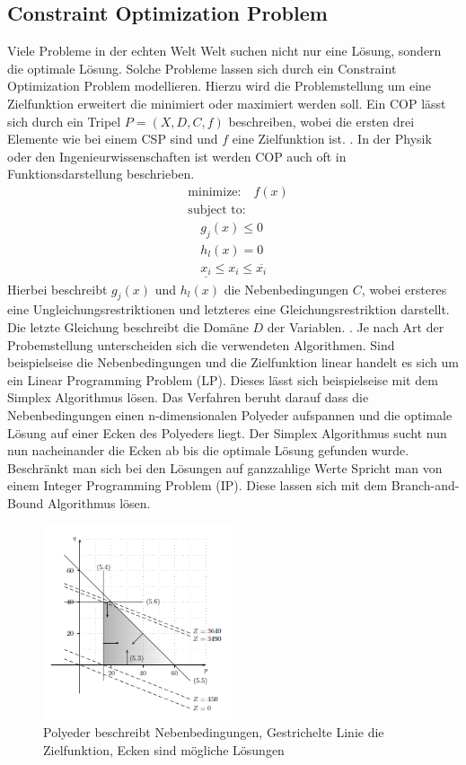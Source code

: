 \subsection{Constraint Optimization Problem}
\label{sec: Constraint Optimization Problem}
Viele Probleme in der echten Welt Welt suchen nicht nur eine Lösung, sondern die
optimale Lösung. Solche Probleme lassen sich durch ein Constraint Optimization
Problem modellieren. Hierzu wird die Problemstellung um eine Zielfunktion
erweitert die minimiert oder maximiert werden soll. Ein COP lässt sich durch ein
Tripel $P=(X,D,C,f)$ beschreiben, wobei die ersten drei Elemente wie bei einem
CSP sind und $f$ eine Zielfunktion ist. \cite[22]{amadi15jo}. In der Physik oder
den Ingenieurwissenschaften ist werden COP auch oft in Funktionsdarstellung
beschrieben.
\begin{align*}
    &\text{minimize:} \quad f(x) \\
    &\text{subject to:} \\
    &\quad g_j(x) \leq 0 \\
    &\quad h_l(x) = 0 \\
    &\quad \underline{x_i} \leq x_i \leq \overline{x_i}
\end{align*}
Hierbei beschreibt $g_j(x)$ und $h_l(x)$ die Nebenbedingungen $C$, wobei
ersteres eine Ungleichungsrestriktionen und letzteres eine Gleichungsrestriktion
darstellt. Die letzte Gleichung beschreibt die Domäne $D$ der Variablen.
\cite[154]{marti21bo}. Je nach Art der Probemstellung unterscheiden sich die
verwendeten Algorithmen. Sind beispielseise die Nebenbedingungen und die
Zielfunktion linear handelt es sich um ein Linear Programming Problem (LP).
Dieses lässt sich beispielseise mit dem Simplex Algorithmus lösen. Das Verfahren
beruht darauf dass die Nebenbedingungen einen n-dimensionalen Polyeder
aufspannen und die optimale Lösung auf einer Ecken des Polyeders liegt. Der
Simplex Algorithmus sucht nun nun nacheinander die Ecken ab bis die optimale
Lösung gefunden wurde. Beschränkt man sich bei den Lösungen auf ganzzahlige
Werte Spricht man von einem Integer Programming Problem (IP). Diese lassen sich 
mit dem Branch-and-Bound Algorithmus lösen. \cite{dakin65jo}
\cite[99]{hofst07bo}
\begin{figure}[h]
    \centering
    \includegraphics[width=0.5\textwidth]{figures/Simplex.PNG}
    \caption{Polyeder beschreibt Nebenbedingungen, Gestrichelte Linie die
    Zielfunktion,  Ecken sind mögliche Lösungen \cite[100]{hofst07bo}}
    \label{fig:bild}
\end{figure}
